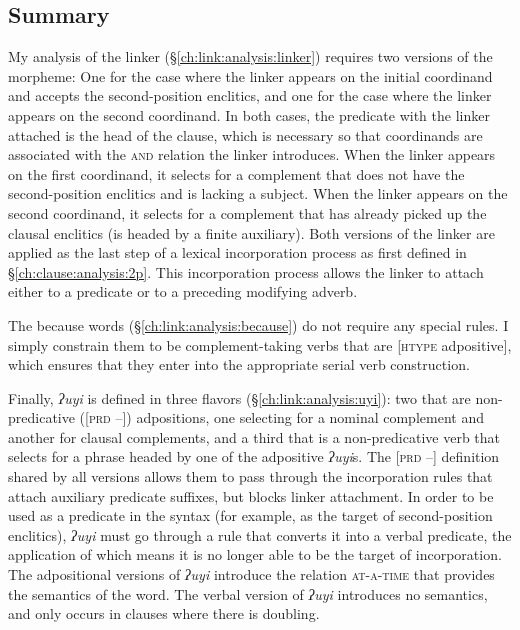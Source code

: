 \subsection{Summary} \label{ch:link:analysis:summary}

My analysis of the linker (\S\ref{ch:link:analysis:linker}) requires two versions of the morpheme: One for the case where the linker appears on the initial coordinand and accepts the second-position enclitics, and one for the case where the linker appears on the second coordinand. In both cases, the predicate with the linker attached is the head of the clause, which is necessary so that coordinands are associated with the \textsc{and} relation the linker introduces. When the linker appears on the first coordinand, it selects for a complement that does not have the second-position enclitics and is lacking a subject. When the linker appears on the second coordinand, it selects for a complement that has already picked up the clausal enclitics (is headed by a finite auxiliary). Both versions of the linker are applied as the last step of a lexical incorporation process as first defined in \S\ref{ch:clause:analysis:2p}. This incorporation process allows the linker to attach either to a predicate or to a preceding modifying adverb.

The because words (\S\ref{ch:link:analysis:because}) do not require any special rules. I simply constrain them to be complement-taking verbs that are [\textsc{htype} adpositive], which ensures that they enter into the appropriate serial verb construction.

Finally, \textit{ʔuyi} is defined in three flavors (\S\ref{ch:link:analysis:uyi}): two that are non-predicative ([\textsc{prd} --]) adpositions, one selecting for a nominal complement and another for clausal complements, and a third that is a non-predicative verb that selects for a phrase headed by one of the adpositive \textit{ʔuyi}s. The [\textsc{prd} --] definition shared by all versions allows them to pass through the incorporation rules that attach auxiliary predicate suffixes, but blocks linker attachment. In order to be used as a predicate in the syntax (for example, as the target of second-position enclitics), \textit{ʔuyi} must go through a rule that converts it into a verbal predicate, the application of which means it is no longer able to be the target of incorporation. The adpositional versions of \textit{ʔuyi} introduce the relation \textsc{at-a-time} that provides the semantics of the word. The verbal version of \textit{ʔuyi} introduces no semantics, and only occurs in clauses where there is doubling.		